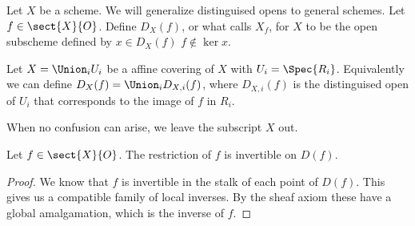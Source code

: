 \begin{definition}
Let $X$ be a scheme. We will generalize distinguised opens to general schemes.
Let $f\in \sect{X}{O}$.
Define $D_X(f)$, or what \cite{harts} calls $X_f$, for $X$ to be the open subscheme
defined by $x\in D_X(f)$ \iff $f\not\in \ker{x}$.

Let $X = \Union_i U_i$ be a affine covering of $X$ with $U_i = \Spec{R_i}$.
Equivalently we can define $D_X(f) = \Union_i D_{X,i}(f)$, 
where $D_{X,i}(f)$ is the distinguised open of $U_i$ 
that corresponds to the image of $f$ in $R_i$.

When no confusion can arise, we leave the subscript $X$ out.
\end{definition}

\begin{lemma}
Let $f\in \sect{X}{O}$.
The restriction of $f$ is invertible on $D(f)$.
\end{lemma}
\begin{proof}
We know that $f$ is invertible in the stalk of each point of $D(f)$.
This gives us a compatible family of local inverses.
By the sheaf axiom these have a global amalgamation, which is the inverse of $f$.
\end{proof}